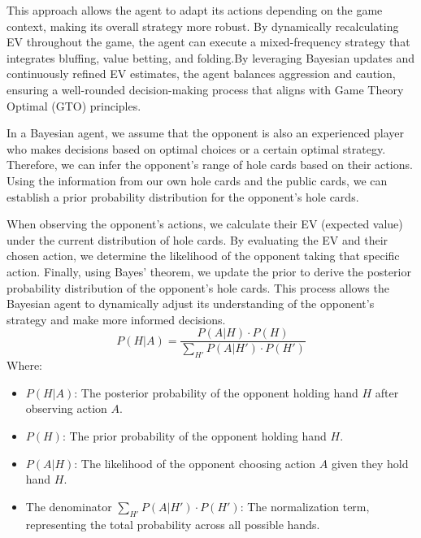 \documentclass{article}
\begin{document}
This approach allows the agent to adapt its actions depending on the game context, making its overall strategy more robust.  By dynamically recalculating EV throughout the game, the agent can execute a mixed-frequency strategy that integrates bluffing, value betting, and folding.By leveraging Bayesian updates and continuously refined EV estimates, the agent balances aggression and caution, ensuring a well-rounded decision-making process that aligns with Game Theory Optimal (GTO) principles.

In a Bayesian agent, we assume that the opponent is also an experienced player who makes decisions based on optimal choices or a certain optimal strategy. Therefore, we can infer the opponent’s range of hole cards based on their actions. Using the information from our own hole cards and the public cards, we can establish a prior probability distribution for the opponent’s hole cards.

When observing the opponent’s actions, we calculate their EV (expected value) under the current distribution of hole cards. By evaluating the EV and their chosen action, we determine the likelihood of the opponent taking that specific action. Finally, using Bayes’ theorem, we update the prior to derive the posterior probability distribution of the opponent’s hole cards. This process allows the Bayesian agent to dynamically adjust its understanding of the opponent’s strategy and make more informed decisions.
\[
P(H | A) = \frac{P(A | H) \cdot P(H)}{\sum_{H'} P(A | H') \cdot P(H')}
\]
Where:
\begin{itemize}
    \item \(P(H | A)\): The posterior probability of the opponent holding hand \(H\) after observing action \(A\).
    \item \(P(H)\): The prior probability of the opponent holding hand \(H\).
    \item \(P(A | H)\): The likelihood of the opponent choosing action \(A\) given they hold hand \(H\).
    \item The denominator \(\sum_{H'} P(A | H') \cdot P(H')\): The normalization term, representing the total probability across all possible hands.
\end{itemize}
\end{document}
